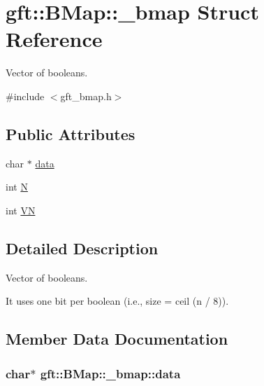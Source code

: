 \hypertarget{structgft_1_1BMap_1_1__bmap}{}\section{gft\+:\+:B\+Map\+:\+:\+\_\+bmap Struct Reference}
\label{structgft_1_1BMap_1_1__bmap}


Vector of booleans.  




{\ttfamily \#include $<$gft\+\_\+bmap.\+h$>$}

\subsection*{Public Attributes}
\begin{DoxyCompactItemize}
\item 
char $\ast$ \hyperlink{structgft_1_1BMap_1_1__bmap_ae3e7927d064a7336798b41c25f775752}{data}
\item 
int \hyperlink{structgft_1_1BMap_1_1__bmap_ae6e8644f37ce49bafb0a6227afcf2a3b}{N}
\item 
int \hyperlink{structgft_1_1BMap_1_1__bmap_a9cdac1fc2425919764aff0630ef907d2}{VN}
\end{DoxyCompactItemize}


\subsection{Detailed Description}
Vector of booleans. 

It uses one bit per boolean (i.\+e., size = ceil (n / 8)). 

\subsection{Member Data Documentation}
\subsubsection[{\texorpdfstring{data}{data}}]{\setlength{\rightskip}{0pt plus 5cm}char$\ast$ gft\+::\+B\+Map\+::\+\_\+bmap\+::data}\hypertarget{structgft_1_1BMap_1_1__bmap_ae3e7927d064a7336798b41c25f775752}{}\label{structgft_1_1BMap_1_1__bmap_ae3e7927d064a7336798b41c25f775752}

